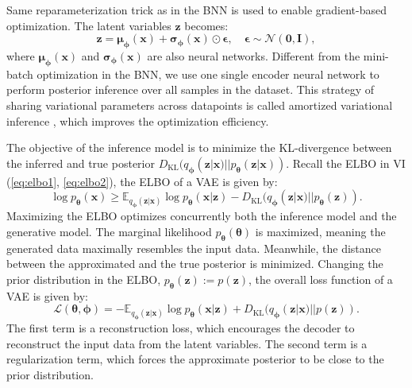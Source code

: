 Same reparameterization trick as in the \ac{BNN} is used to enable gradient-based optimization. The latent variables $\boldsymbol{z}$ becomes:
\begin{equation}
    \boldsymbol{z} = \boldsymbol{\mu}_{\boldsymbol{\phi}}(\boldsymbol{x}) + \boldsymbol{\sigma}_{\boldsymbol{\phi}}(\boldsymbol{x}) \odot \boldsymbol{\epsilon}, \quad \boldsymbol{\epsilon}\sim\mathcal{N}(\boldsymbol{0}, \boldsymbol{I}),
\end{equation}
where $\boldsymbol{\mu}_{\boldsymbol{\phi}}(\boldsymbol{x})$ and $\boldsymbol{\sigma}_{\boldsymbol{\phi}}(\boldsymbol{x})$ are also neural networks. 
Different from the mini-batch optimization in the \ac{BNN}, we use one single encoder neural network to perform posterior inference over all samples in the dataset. This strategy of sharing variational parameters across datapoints is called amortized variational inference \citep{gershman2014amortized, margossian2024amortized}, which improves the optimization efficiency. 

The objective of the inference model is to minimize the \ac{KL}-divergence between the inferred and true posterior $D_{\text{KL}}(q_{\boldsymbol{\phi}}(\boldsymbol{z}|\boldsymbol{x})||p_{\boldsymbol{\theta}}(\boldsymbol{z}|\boldsymbol{x}))$. Recall the \ac{ELBO} in \ac{VI} (\ref{eq:elbo1}, \ref{eq:elbo2}), the \ac{ELBO} of a \ac{VAE} is given by:
\begin{equation}
    \log p_{\boldsymbol{\theta}}(\boldsymbol{x}) \geq \mathbb{E}_{q_{\boldsymbol{\phi}}(\boldsymbol{z}|\boldsymbol{x})}\log p_{\boldsymbol{\theta}}(\boldsymbol{x}|\boldsymbol{z}) - D_{\text{KL}}(q_{\boldsymbol{\phi}}(\boldsymbol{z}|\boldsymbol{x})||p_{\boldsymbol{\theta}}(\boldsymbol{z})).
\end{equation}
Maximizing the \ac{ELBO} optimizes concurrently both the inference model and the generative model. The marginal likelihood $p_{\boldsymbol{\theta}}(\boldsymbol{\theta})$ is maximized, meaning the generated data maximally resembles the input data. Meanwhile, the distance between the approximated and the true posterior is minimized. 
Changing the prior distribution in the \ac{ELBO}, $p_{\boldsymbol{\theta}}(\boldsymbol{z}):=p(\boldsymbol{z})$, the overall loss function of a \ac{VAE} is given by:
\begin{equation}
    \mathcal{L}(\boldsymbol{\theta}, \boldsymbol{\phi}) = -\mathbb{E}_{q_{\boldsymbol{\phi}}(\boldsymbol{z}|\boldsymbol{x})}\log p_{\boldsymbol{\theta}}(\boldsymbol{x}|\boldsymbol{z}) + D_{\text{KL}}(q_{\boldsymbol{\phi}}(\boldsymbol{z}|\boldsymbol{x})||p(\boldsymbol{z})).
\end{equation}
The first term is a reconstruction loss, which encourages the decoder to reconstruct the input data from the latent variables. The second term is a regularization term, which forces the approximate posterior to be close to the prior distribution.

